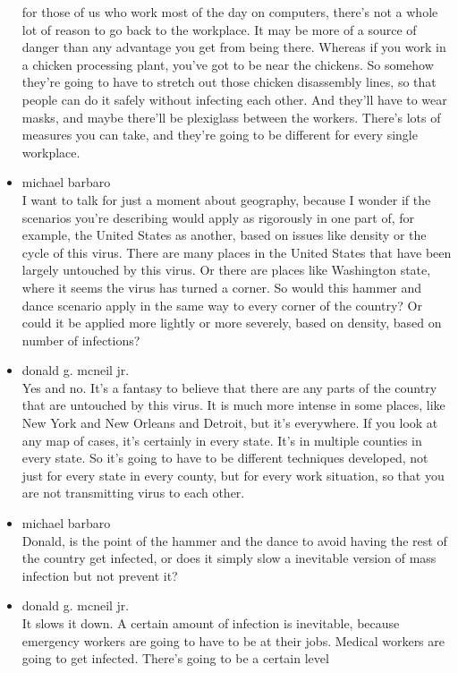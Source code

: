 \begin{itemize}
  for those of us who work most of the day on computers, there's not a
  whole lot of reason to go back to the workplace. It may be more of a
  source of danger than any advantage you get from being there. Whereas
  if you work in a chicken processing plant, you've got to be near the
  chickens. So somehow they're going to have to stretch out those
  chicken disassembly lines, so that people can do it safely without
  infecting each other. And they'll have to wear masks, and maybe
  there'll be plexiglass between the workers. There's lots of measures
  you can take, and they're going to be different for every single
  workplace.
\item
  michael barbaro\\
  I want to talk for just a moment about geography, because I wonder if
  the scenarios you're describing would apply as rigorously in one part
  of, for example, the United States as another, based on issues like
  density or the cycle of this virus. There are many places in the
  United States that have been largely untouched by this virus. Or there
  are places like Washington state, where it seems the virus has turned
  a corner. So would this hammer and dance scenario apply in the same
  way to every corner of the country? Or could it be applied more
  lightly or more severely, based on density, based on number of
  infections?
\item
  donald g. mcneil jr.\\
  Yes and no. It's a fantasy to believe that there are any parts of the
  country that are untouched by this virus. It is much more intense in
  some places, like New York and New Orleans and Detroit, but it's
  everywhere. If you look at any map of cases, it's certainly in every
  state. It's in multiple counties in every state. So it's going to have
  to be different techniques developed, not just for every state in
  every county, but for every work situation, so that you are not
  transmitting virus to each other.
\item
  michael barbaro\\
  Donald, is the point of the hammer and the dance to avoid having the
  rest of the country get infected, or does it simply slow a inevitable
  version of mass infection but not prevent it?
\item
  donald g. mcneil jr.\\
  It slows it down. A certain amount of infection is inevitable, because
  emergency workers are going to have to be at their jobs. Medical
  workers are going to get infected. There's going to be a certain level

\end{itemize}
